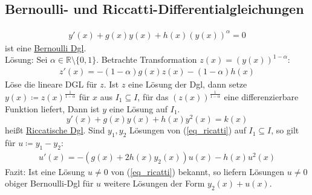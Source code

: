 \documentclass{article}
\begin{document}
\subsection{Bernoulli- und Riccatti-Differentialgleichungen}
\begin{align*}
    y'(x) + g(x)y(x) + h(x)(y(x))^\alpha = 0
\end{align*}
ist eine \underline{Bernoulli Dgl}. \\
Lösung: Sei $\alpha \in \mathbb{R} \setminus \{0,1\}$. Betrachte Transformation $z(x) = (y(x))^{1 - \alpha}$:
\begin{align*}
    z'(x) = - (1-\alpha)g(x)z(x) -(1-\alpha)h(x)
\end{align*}
Löse die lineare DGL für $z$. Ist $z$ eine Lösung der Dgl, dann setze $y(x) \coloneqq z(x)^{\frac{1}{1 - \alpha}}$ für $x$ aus $I_1 \subseteq I$,
für das $(z(x))^{\frac{1}{1- \alpha}}$ eine differenzierbare Funktion liefert, Dann ist $y$ eine Lösung auf $I_1$.
\begin{equation} \label{eq_ricatti}
    y'(x) + g(x)y(x) + h(x)y^2(x) = k(x)
\end{equation}
heißt \underline{Riccatische Dgl}. Sind $y_1,y_2$ Lösungen von (\ref{eq_ricatti}) auf $I_1 \subseteq I$, so gilt für $u \coloneqq y_1 - y_2$:
\begin{align*}
    u'(x) = -(g(x) + 2h(x)y_2(x))u(x) - h(x)u^2(x)
\end{align*}
Fazit: Ist eine Lösung $u \neq 0$ von (\ref{eq_ricatti}) bekannt, so liefern Lösungen $u \neq 0$ obiger Bernoulli-Dgl für $u$ weitere Lösungen der Form $y_2(x) + u(x)$.
\end{document}
